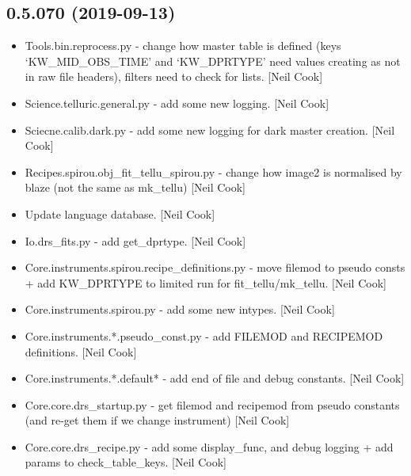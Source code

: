 \documentclass[a4paper,10pt,english]{report}
\begin{document}
\subsection{0.5.070 (2019-09-13)}
\label{\detokenize{misc/changelog:id71}}\begin{itemize}
\item {} 
Tools.bin.reprocess.py - change how master table is defined (keys
‘KW\_MID\_OBS\_TIME’ and ‘KW\_DPRTYPE’ need values creating as not in raw
file headers), filters need to check for lists. {[}Neil Cook{]}

\item {} 
Science.telluric.general.py - add some new logging. {[}Neil Cook{]}

\item {} 
Sciecne.calib.dark.py - add some new logging for dark master creation.
{[}Neil Cook{]}

\item {} 
Recipes.spirou.obj\_fit\_tellu\_spirou.py - change how image2 is
normalised by blaze (not the same as mk\_tellu) {[}Neil Cook{]}

\item {} 
Update language database. {[}Neil Cook{]}

\item {} 
Io.drs\_fits.py - add get\_dprtype. {[}Neil Cook{]}

\item {} 
Core.instruments.spirou.recipe\_definitions.py - move filemod to pseudo
consts + add KW\_DPRTYPE to limited run for fit\_tellu/mk\_tellu. {[}Neil
Cook{]}

\item {} 
Core.instruments.spirou.py - add some new intypes. {[}Neil Cook{]}

\item {} 
Core.instruments.*.pseudo\_const.py - add FILEMOD and RECIPEMOD
definitions. {[}Neil Cook{]}

\item {} 
Core.instruments.*.default* - add end of file and debug constants.
{[}Neil Cook{]}

\item {} 
Core.core.drs\_startup.py - get filemod and recipemod from pseudo
constants (and re-get them if we change instrument) {[}Neil Cook{]}

\item {} 
Core.core.drs\_recipe.py - add some display\_func, and debug logging +
add params to check\_table\_keys. {[}Neil Cook{]}


\end{itemize}
\end{document}
